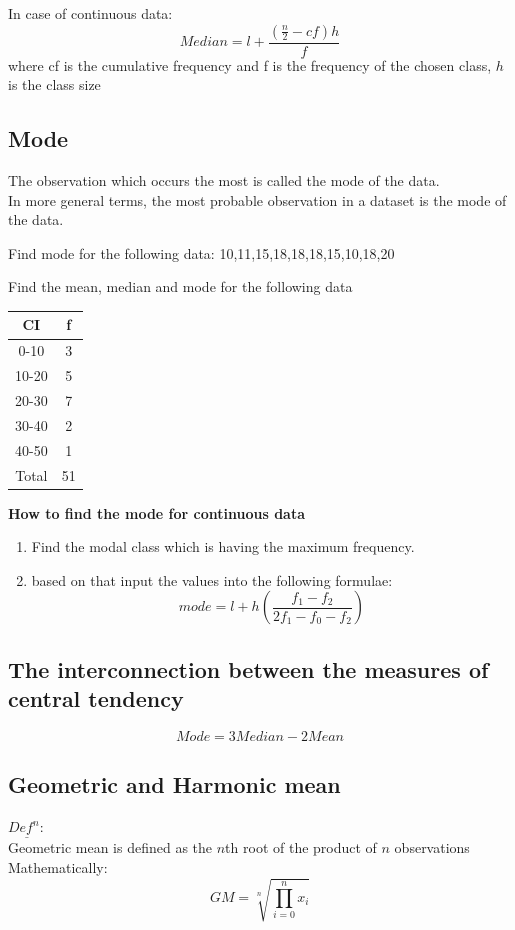 \documentclass[11pt,letterpaper]{article}
\newenvironment{problem}[2][Problem]                                  
        {\begin{tcolorbox}[colback=white,colframe=gray!50,title=#1 #2]}
        {\end{tcolorbox}}
\newenvironment{definition}
	{\begin{mdframed}$\underline{\textit{Def}^\textit{n}:} $\\}
	{\end{mdframed}}
\begin{document}
In case of continuous data:
\[
  Median = l + \frac{\left( \frac{n}{2} - cf \right)h}{f}
\]
where cf is the cumulative frequency and f is the frequency of the chosen class, $h$ is the class size

\subsection{Mode}
The observation which occurs the most is called the mode of the data. \\
In more general terms, the most probable observation in a dataset is the mode of the data. 

\begin{problem}5
  Find mode for the following data:
  10,11,15,18,18,18,15,10,18,20
\end{problem}

\begin{problem}6
  Find the mean, median and mode for the following data
  \begin{center}
    \begin{tabular}{c|c}
      CI & f \\
      \hline
      0-10 & 3 \\
      10-20 & 5 \\ 
      20-30 & 7 \\ 
      30-40 & 2\\ 
      40-50 & 1 \\ 
      \hline
      Total & 51 \\
    \end{tabular}
  \end{center}
\end{problem}
\textbf{How to find the mode for continuous data}
\begin{enumerate}
  \item Find the modal class which is having the maximum frequency.
  \item based on that input the values into the following formulae:
    \[
      mode = l + h \left( \frac{f_1 - f_2}{2f_1-f_0-f_2} \right)
    \]
\end{enumerate}
\subsection{The interconnection between the measures of central tendency}
\[
  Mode = 3 Median - 2 Mean
\]

\subsection{Geometric and Harmonic mean}
\begin{definition}
   Geometric mean is defined as the $n$th root of the product of $n$ observations\\
   Mathematically:
   \[
     GM = \sqrt[n]{\prod_{i=0}^n x_i}
   \]
\end{definition}
\end{document}
